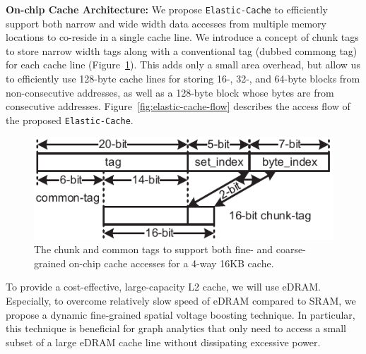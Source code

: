 \noindent
\textbf{On-chip Cache Architecture:} 
We propose \texttt{Elastic-Cache} to efficiently support both narrow and wide width data accesses from multiple memory locations to co-reside in a single cache line. 
We introduce a concept of chunk tags to store narrow width tags along with a conventional tag (dubbed commong tag) for each cache line (Figure~\ref{fig:elastic-cache}). 
This adds only a small area overhead, but allow us to efficiently use 128-byte cache lines for storing 16-, 32-, and 64-byte blocks from non-consecutive addresses, as well as a 128-byte block whose bytes are from consecutive addresses.
Figure~\ref{fig:elastic-cache-flow} describes the access flow of the proposed \texttt{Elastic-Cache}. 

\begin{figure}
\center
\includegraphics[width=1.0\linewidth]{./fig/chunk_tag_16bit-eps-converted-to.pdf}
\caption{The chunk and common tags to support both fine- and coarse-grained on-chip cache accesses for a 4-way 16KB cache.}
\label{fig:elastic-cache}
\end{figure}


To provide a cost-effective, large-capacity L2 cache, we will use eDRAM. 
Especially, to overcome relatively slow speed of eDRAM compared to SRAM, we propose a dynamic fine-grained spatial voltage boosting technique. 
In particular, this technique is beneficial for graph analytics that only need to access a small subset of a large eDRAM cache line without dissipating excessive power.

